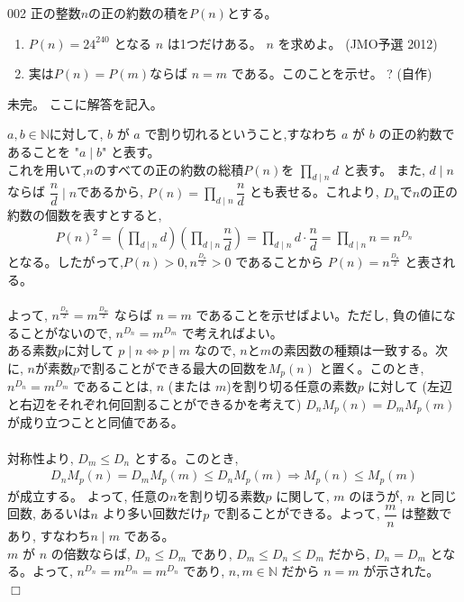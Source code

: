 \begin{prob}{002}{}{}
 正の整数$n$の正の約数の積を$P(n)$とする。
 \begin{enumerate}
  \item $P(n)=24^{240}$ となる $n$ は1つだけある。 $n$ を求めよ。  (JMO予選 2012)
  \item 実は$P(n)=P(m)$ならば $n=m$ である。このことを示せ。 \hosi ? (自作)
 \end{enumerate}
\end{prob}
未完。
ここに解答を記入。

$a,b\in\mathbb{N}$に対して, $b$ が $a$ で割り切れるということ,すなわち $a$ が $b$ の正の約数であることを "$a\mid b$" と表す。\\
これを用いて,$n$のすべての正の約数の総積$P(n)$を $\displaystyle\prod_{d\mid n}d$ と表す。 また, $d\mid n$ならば $\dfrac{n}{d}\mid n$であるから, $P(n)=\displaystyle\prod_{d\mid n}\dfrac{n}{d}$ とも表せる。これより, $D_n$で$n$の正の約数の個数を表すとすると,
\begin{eqnarray*}
P(n)^2 = \left(\displaystyle\prod_{d\mid n}d\right)\left(\displaystyle\prod_{d\mid n}\dfrac{n}{d}\right) = \displaystyle\prod_{d\mid n}d\cdot \dfrac{n}{d} = \displaystyle\prod_{d\mid n}n = n^{D_n}
\end{eqnarray*}
となる。したがって,$P(n)>0, n^{\frac{D_n}{2}}>0$ であることから $P(n)=n^{\frac{D_n}{2}}$ と表される。\\
\\
よって, $n^{\frac{D_n}{2}}=m^{\frac{D_m}{2}}$ ならば $n=m$ であることを示せばよい。ただし, 負の値になることがないので, $n^{D_n}=m^{D_m}$ で考えればよい。\\
ある素数$p$に対して $p\mid n\iff p\mid m$ なので, $n$と$m$の素因数の種類は一致する。次に, $n$が素数$p$で割ることができる最大の回数を$M_p(n)$ と置く。このとき, $n^{D_n}=m^{D_m}$ であることは, $n$ (または $m$)を割り切る任意の素数$p$ に対して (左辺と右辺をそれぞれ何回割ることができるかを考えて) $D_nM_p(n)=D_mM_p(m)$ が成り立つことと同値である。\\
\\
対称性より, $D_m\le D_n$ とする。このとき,
\begin{eqnarray*}
D_nM_p(n)=D_mM_p(m)\le D_nM_p(m) \Rightarrow M_p(n)\le M_p(m)
\end{eqnarray*}
が成立する。 よって, 任意の$n$を割り切る素数$p$ に関して, $m$ のほうが, $n$ と同じ回数, あるいは$n$ より多い回数だけ$p$ で割ることができる。よって, $\dfrac{m}{n}$ は整数であり, すなわち$n\mid m$ である。\\
$m$ が $n$ の倍数ならば,  $D_n\le D_m$ であり, $D_m\le D_n\le D_m$ だから, $D_n=D_m$ となる。よって, $n^{D_n}=m^{D_m}=m^{D_n}$ であり, $n,m\in\mathbb{N}$ だから $n=m$ が示された。　　$\Box$
